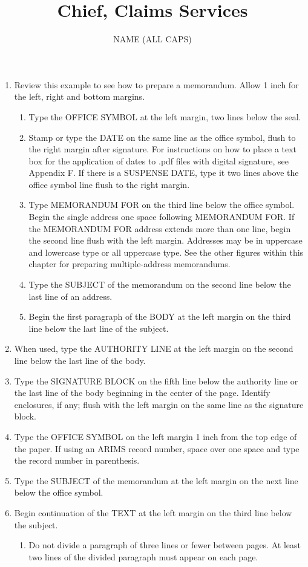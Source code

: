 \documentclass{./latex/armymemo-notikz}
\author{NAME (ALL CAPS)}\rank{Major}\branch{JA}
\title{Chief, Claims Services}
\begin{document}
\begin{enumerate}
\item Review this example to see how to prepare a memorandum. Allow 1 inch for the left, right and bottom margins.
\begin{enumerate}
\item Type the OFFICE SYMBOL at the left margin, two lines below the seal.
\item Stamp or type the DATE on the same line as the office symbol, flush to the right margin after signature. For instructions on how to place a text box for the application of dates to .pdf files with digital signature, see Appendix F. If there is a SUSPENSE DATE, type it two lines above the office symbol line flush to the right margin.
\item Type MEMORANDUM FOR on the third line below the office symbol. Begin the single address one space following MEMORANDUM FOR. If the MEMORANDUM FOR address extends more than one line, begin the second line flush with the left margin. Addresses may be in uppercase and lowercase type or all uppercase type. See the other figures within this chapter for preparing multiple-address memorandums.
\item Type the SUBJECT of the memorandum on the second line below the last line of an address.
\item Begin the first paragraph of the BODY at the left margin on the third line below the last line of the subject.
\end{enumerate}
\item When used, type the AUTHORITY LINE at the left margin on the second line below the last line of the body.
\item Type the SIGNATURE BLOCK on the fifth line below the authority line or the last line of the body beginning in the center of the page. Identify enclosures, if any; flush with the left margin on the same line as the signature block.
\item Type the OFFICE SYMBOL on the left margin 1 inch from the top edge of the paper. If using an ARIMS record number, space over one space and type the record number in parenthesis.
\item Type the SUBJECT of the memorandum at the left margin on the next line below the office symbol.
\item Begin continuation of the TEXT at the left margin on the third line below the subject.
\begin{enumerate}
\item Do not divide a paragraph of three lines or fewer between pages. At least two lines of the divided paragraph must appear on each page.

\end{enumerate}
\end{enumerate}
\end{document}
